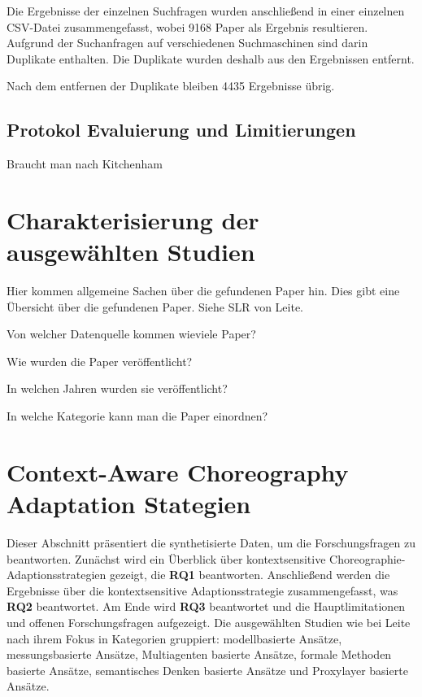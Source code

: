 \documentclass[conference,compsoc]{IEEEtran}
\begin{document}
Die Ergebnisse der einzelnen Suchfragen wurden anschließend in einer einzelnen CSV-Datei zusammengefasst, wobei 9168 Paper als Ergebnis resultieren. Aufgrund der Suchanfragen auf verschiedenen Suchmaschinen sind darin Duplikate enthalten. Die Duplikate wurden deshalb aus den Ergebnissen entfernt.


Nach dem entfernen der Duplikate bleiben 4435 Ergebnisse übrig.

\subsection{Protokol Evaluierung und Limitierungen}
Braucht man nach Kitchenham

\section{Charakterisierung der ausgewählten Studien}
Hier kommen allgemeine Sachen über die gefundenen Paper hin. Dies gibt eine Übersicht über die gefundenen Paper. Siehe SLR von Leite\cite{leite2013systematic}.

Von welcher Datenquelle kommen wieviele Paper?

Wie wurden die Paper veröffentlicht?

In welchen Jahren wurden sie veröffentlicht?

In welche Kategorie kann man die Paper einordnen?

\section{Context-Aware Choreography Adaptation Stategien}
Dieser Abschnitt präsentiert die synthetisierte Daten, um die Forschungsfragen zu beantworten. Zunächst wird ein Überblick über  kontextsensitive Choreographie-Adaptionsstrategien gezeigt, die \textbf{RQ1} beantworten. Anschließend werden die Ergebnisse über die kontextsensitive Adaptionsstrategie zusammengefasst, was \textbf{RQ2} beantwortet. Am Ende wird \textbf{RQ3} beantwortet und die Hauptlimitationen und offenen Forschungsfragen aufgezeigt.
Die ausgewählten Studien wie bei Leite~\cite{leite2013systematic} nach ihrem Fokus in Kategorien gruppiert: modellbasierte Ansätze, messungsbasierte Ansätze, Multiagenten basierte Ansätze, formale Methoden basierte Ansätze, semantisches Denken basierte Ansätze und Proxylayer basierte Ansätze.
\end{document}
